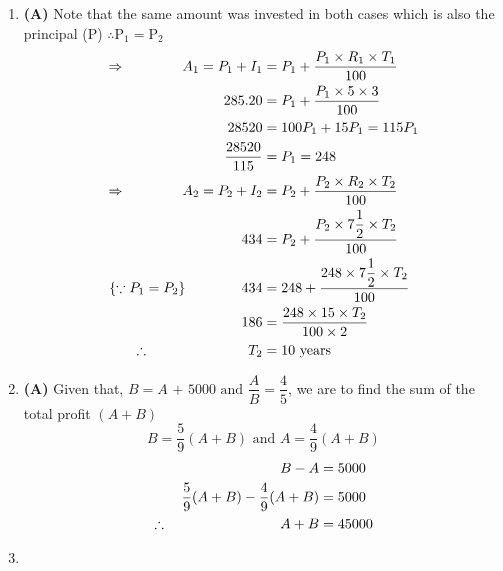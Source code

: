 \begin{multicols}{2}
\begin{enumerate}[label={\textbf{\arabic*.}}]
    \item \textbf{(A)} Note that the same amount was invested in both cases which is also the principal (P) 
    \( \therefore \text{P}_1 = \text{P}_2\)
    \begin{align*} 
        \Rightarrow \hspace{40px} A_1 = P_1 + I_1 &= P_1 + \dfrac{P_1 \times R_1 \times T_1}{100} \\
        285.20&= P_1 + \dfrac{P_1 \times 5 \times 3}{100} \\
         28520 &= 100P_1 + 15P_1 = 115P_1 \\
         \dfrac{28520}{115}&= P_1 = 248 \\
        \Rightarrow \hspace{40px}  A_2 = P_2 + I_2 &= P_2 + \dfrac{P_2 \times R_2 \times T_2}{100} \\
        434&= P_2 + \dfrac{P_2 \times 7\dfrac{1}{2} \times T_2}{100} \\
        \{ \because P_1 = P_2\} \hspace{40px} 434&= 248 + \dfrac{248 \times 7\dfrac{1}{2} \times T_2}{100} \\
        186 &= \dfrac{248 \times 15 \times T_2}{100 \times 2} \\
        \therefore \hspace{70px} T_2 & = 10 \text{ years}
    \end{align*}
    
    \item \textbf{(A) } Given that, \(B = A \text{ + 5000 and } \dfrac{A}{B} = \dfrac{4}{5}\), we are to find the sum 
    of the total profit $\left( A + B\right)$
    \[B = \dfrac{5}{9}(A + B) \text{ and } A = \dfrac{4}{9}(A + B)\]
    \begin{align*}
        B - A &= 5000 \\
        \dfrac{5}{9}(A + B) - \dfrac{4}{9}(A + B) &= 5000 \\
        \therefore \hspace{80px}  A + B &= 45000
    \end{align*}
    
    \item  


\end{enumerate}
\end{multicols}

